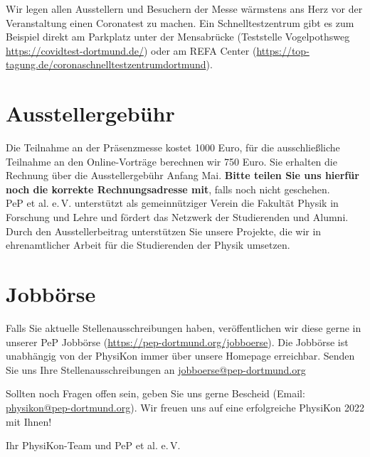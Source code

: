 \documentclass[
  paper=a4,
  fontsize=12pt,
  DIV=16,
  headheight=30pt,
  footheight=45pt,
  headinclude,
  parskip=half,
]{scrartcl}
\begin{document}
Wir legen allen Ausstellern und Besuchern der Messe wärmstens ans Herz vor der Veranstaltung einen Coronatest zu machen.
Ein Schnelltestzentrum gibt es zum Beispiel direkt am Parkplatz unter der Mensabrücke (Teststelle Vogelpothsweg \url{https://covidtest-dortmund.de/}) oder am REFA Center (\url{https://top-tagung.de/coronaschnelltestzentrumdortmund}).


\section*{Ausstellergebühr}
Die Teilnahme an der Präsenzmesse kostet 1000 Euro, für die ausschließliche Teilnahme an den Online-Vorträge berechnen wir 750 Euro.
Sie erhalten die Rechnung über die Ausstellergebühr Anfang Mai.
\textbf{Bitte teilen Sie uns hierfür noch die korrekte Rechnungsadresse mit}, falls noch nicht geschehen.\\
PeP et al. e.\,V. unterstützt als gemeinnütziger Verein die Fakultät Physik in Forschung und Lehre und fördert das Netzwerk der Studierenden und Alumni.
Durch den Ausstellerbeitrag unterstützen Sie unsere Projekte, die wir in ehrenamtlicher Arbeit für die Studierenden der Physik umsetzen.

\section*{Jobbörse}

Falls Sie aktuelle Stellenausschreibungen haben, veröffentlichen wir diese gerne in unserer PeP Jobbörse (\url{https://pep-dortmund.org/jobboerse}).
Die Jobbörse ist unabhängig von der PhysiKon immer über unsere Homepage erreichbar.
Senden Sie uns Ihre Stellenausschreibungen an \href{mailto:jobboerse@pep-dortmund.org}{jobboerse@pep-dortmund.org}

\vspace{0.5cm}

Sollten noch Fragen offen sein, geben Sie uns gerne Bescheid (Email: \href{mailto:physikon@pep-dortmund.org}{physikon@pep-dortmund.org}).
Wir freuen uns auf eine erfolgreiche PhysiKon 2022 mit Ihnen!

Ihr PhysiKon-Team und PeP et al. e.\,V.
\end{document}
